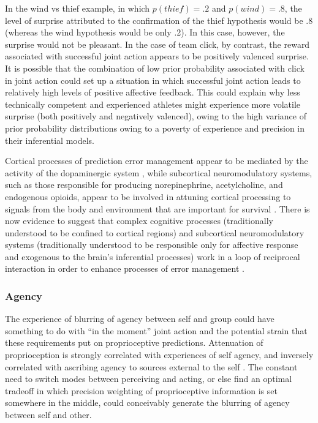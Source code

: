 \begin{CJK}{UTF8}{gbsn}
In the wind vs thief example, in which $p(thief) = .2$ and $p(wind) = .8$, the level of surprise attributed to the confirmation of the thief hypothesis would be .8 (whereas the wind hypothesis would be only .2).  In this case, however, the surprise would not be pleasant. In the case of team click, by contrast, the reward associated with successful joint action appears to be positively valenced surprise.  It is possible that the combination of low prior probability associated with click in joint action could set up a situation in which successful joint action leads to relatively high levels of positive affective feedback.  This could explain why less technically competent and experienced athletes might experience more volatile surprise (both positively and negatively valenced), owing to the high variance of prior probability distributions owing to a poverty of experience and precision in their inferential models.

Cortical processes of prediction error management appear to be mediated by the activity of the dopaminergic system \citep{Schultz2016}, while subcortical neuromodulatory systems, such as those responsible for producing norepinephrine, acetylcholine, and endogenous opioids, appear to be involved in attuning cortical processing to signals from the body and environment that are important for survival \citep{Lewis2005}.  There is now evidence to suggest that complex cognitive processes (traditionally understood to be confined to cortical regions) and subcortical neuromodulatory systems (traditionally understood to be responsible only for affective response and exogenous to the brain's inferential processes) work in a loop of reciprocal interaction in order to enhance processes of error management \citep{Damasio1994,Lewis2005,Miller2017,Barrett2017}.

\subsubsection{Agency}
The experience of blurring of agency between self and group could have something to do with ``in the moment'' joint action and the potential strain that these requirements put on proprioceptive predictions.  Attenuation of proprioception is strongly correlated with experiences of self agency, and inversely correlated with ascribing agency to sources external to the self \citep{Brown2013}.  The constant need to switch modes between perceiving and acting, or else find an optimal tradeoff in which precision weighting of proprioceptive information is set somewhere in the middle, could conceivably generate the blurring of agency between self and other.


\end{CJK}
